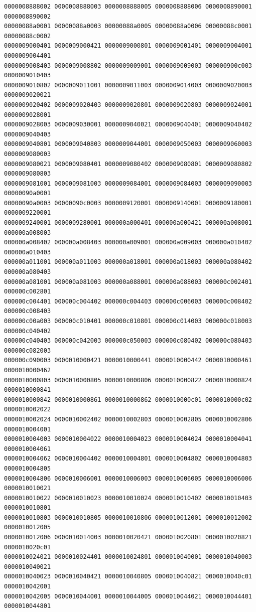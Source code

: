 \begin{Verbatim}[fontsize=\scriptsize]
0000008888002 0000008888003 0000008888005 0000008888006 0000008890001 0000008890002
00000088a0001 00000088a0003 00000088a0005 00000088a0006 00000088c0001 00000088c0002
0000009000401 0000009000421 0000009000801 0000009001401 0000009004001 0000009004401
0000009008403 0000009008802 0000009009001 0000009009003 000000900c003 0000009010403
0000009010802 0000009011001 0000009011003 0000009014003 0000009020003 0000009020021
0000009020402 0000009020403 0000009020801 0000009020803 0000009024001 0000009028001
0000009028003 0000009030001 0000009040021 0000009040401 0000009040402 0000009040403
0000009040801 0000009040803 0000009044001 0000009050003 0000009060003 0000009080003
0000009080021 0000009080401 0000009080402 0000009080801 0000009080802 0000009080803
0000009081001 0000009081003 0000009084001 0000009084003 0000009090003 00000090a0001
00000090a0003 00000090c0003 0000009120001 0000009140001 0000009180001 0000009220001
0000009240001 0000009280001 000000a000401 000000a000421 000000a008001 000000a008003
000000a008402 000000a008403 000000a009001 000000a009003 000000a010402 000000a010403
000000a011001 000000a011003 000000a018001 000000a018003 000000a080402 000000a080403
000000a081001 000000a081003 000000a088001 000000a088003 000000c002401 000000c002801
000000c004401 000000c004402 000000c004403 000000c006003 000000c008402 000000c008403
000000c00a003 000000c010401 000000c010801 000000c014003 000000c018003 000000c040402
000000c040403 000000c042003 000000c050003 000000c080402 000000c080403 000000c082003
000000c090003 0000010000421 0000010000441 0000010000442 0000010000461 0000010000462
0000010000803 0000010000805 0000010000806 0000010000822 0000010000824 0000010000841
0000010000842 0000010000861 0000010000862 0000010000c01 0000010000c02 0000010002022
0000010002024 0000010002402 0000010002803 0000010002805 0000010002806 0000010004001
0000010004003 0000010004022 0000010004023 0000010004024 0000010004041 0000010004061
0000010004062 0000010004402 0000010004801 0000010004802 0000010004803 0000010004805
0000010004806 0000010006001 0000010006003 0000010006005 0000010006006 0000010010021
0000010010022 0000010010023 0000010010024 0000010010402 0000010010403 0000010010801
0000010010803 0000010010805 0000010010806 0000010012001 0000010012002 0000010012005
0000010012006 0000010014003 0000010020421 0000010020801 0000010020821 0000010020c01
0000010024021 0000010024401 0000010024801 0000010040001 0000010040003 0000010040021
0000010040023 0000010040421 0000010040805 0000010040821 0000010040c01 0000010042001
0000010042005 0000010044001 0000010044005 0000010044021 0000010044401 0000010044801

\end{Verbatim}
